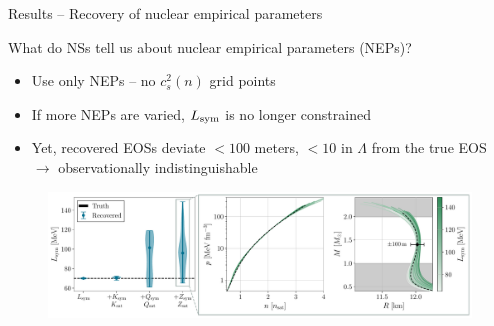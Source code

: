 \documentclass[usenames,dvipsnames,t]{beamer}
\begin{document}
\begin{frame}{Results -- Recovery of nuclear empirical parameters}

  \def\x{3mm}
  \def\y{2mm}

  What do NSs tell us about nuclear empirical parameters (NEPs)?

  \vspace{\y}

  \begin{itemize}
    \item Use only NEPs -- no $c_s^2(n)$ grid points



    \vspace{\x}

    \item If more NEPs are varied, $L_{\rm{sym}}$ is no longer constrained

    \vspace{\x}
    
    \item Yet, recovered EOSs deviate $<100$ meters, $<10$ in $\Lambda$ from the true EOS $\rightarrow$ observationally indistinguishable %
  \end{itemize}

  \begin{figure}
    \centering
    \includegraphics[width=1.0\linewidth]{Figures/money_plot.pdf}
  \end{figure}
\end{frame}
\end{document}
